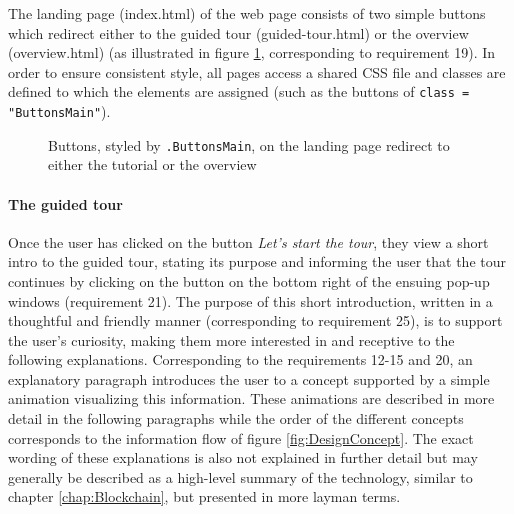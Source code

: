 The landing page (index.html) of the web page consists of two simple buttons which redirect either to the guided tour (guided-tour.html) or the overview (overview.html) (as illustrated in figure \ref{fig:ButtonStyle}, corresponding to requirement 19). In order to ensure consistent style, all pages access a shared \ac{CSS} file and classes are defined to which the elements are assigned (such as the buttons of \texttt{class = "ButtonsMain"}). 

\begin{figure}
    \centering
    
    \caption{Buttons, styled by \texttt{.ButtonsMain}, on the landing page redirect to either the tutorial or the overview}
    \label{fig:ButtonStyle}
\end{figure}

\paragraph{The guided tour} Once the user has clicked on the button \textit{Let's start the tour}, they view a short intro to the guided tour, stating its purpose and informing the user that the tour continues by clicking on the button on the bottom right of the ensuing pop-up windows (requirement 21). The purpose of this short introduction, written in a thoughtful and friendly manner (corresponding to requirement 25), is to support the user's curiosity, making them more interested in and receptive to the following explanations. Corresponding to the requirements 12-15 and 20, an explanatory paragraph introduces the user to a concept supported by a simple animation visualizing this information. These animations are described in more detail in the following paragraphs while the order of the different concepts corresponds to the information flow of figure \ref{fig:DesignConcept}. The exact wording of these explanations is also not explained in further detail but may generally be described as a high-level summary of the technology, similar to chapter \ref{chap:Blockchain}, but presented in more layman terms.

